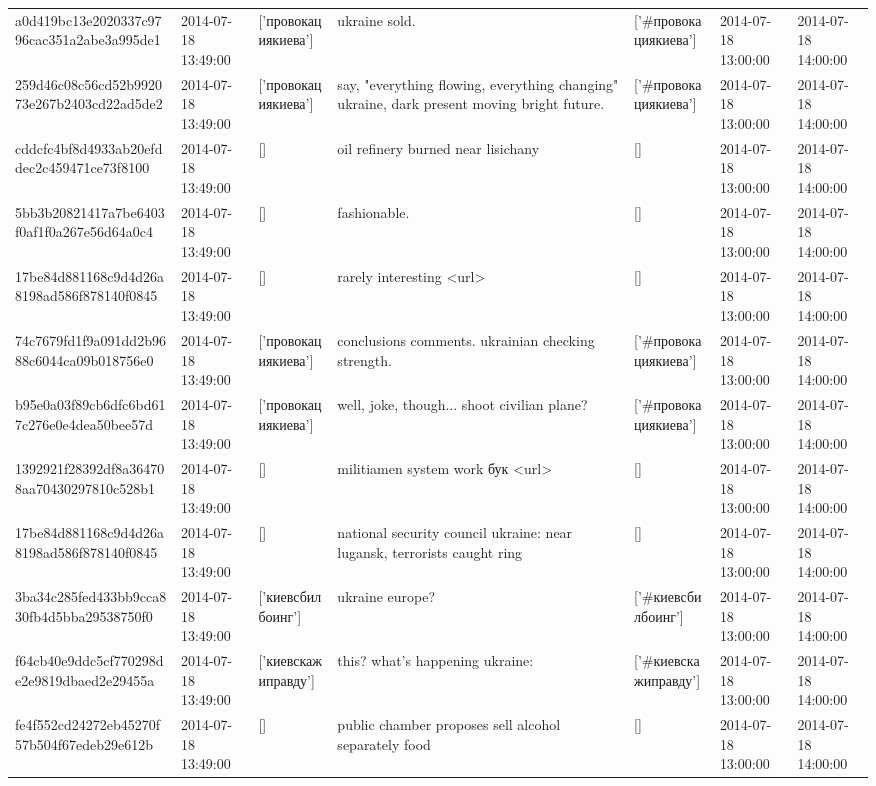\begin{tabular}{lllllll}
a0d419bc13e2020337c9796cac351a2abe3a995de1 & 2014-07-18 13:49:00 & ['провокациякиева'] & ukraine sold. & ['#провокациякиева'] & 2014-07-18 13:00:00 & 2014-07-18 14:00:00 \\
259d46c08c56cd52b992073e267b2403cd22ad5de2 & 2014-07-18 13:49:00 & ['провокациякиева'] & say, "everything flowing, everything changing" ukraine, dark present moving bright future. & ['#провокациякиева'] & 2014-07-18 13:00:00 & 2014-07-18 14:00:00 \\
cddcfc4bf8d4933ab20efddec2c459471ce73f8100 & 2014-07-18 13:49:00 & [] & oil refinery burned near lisichany & [] & 2014-07-18 13:00:00 & 2014-07-18 14:00:00 \\
5bb3b20821417a7be6403f0af1f0a267e56d64a0c4 & 2014-07-18 13:49:00 & [] & fashionable. & [] & 2014-07-18 13:00:00 & 2014-07-18 14:00:00 \\
17be84d881168c9d4d26a8198ad586f878140f0845 & 2014-07-18 13:49:00 & [] & rarely interesting <url> & [] & 2014-07-18 13:00:00 & 2014-07-18 14:00:00 \\
74c7679fd1f9a091dd2b9688c6044ca09b018756e0 & 2014-07-18 13:49:00 & ['провокациякиева'] & conclusions comments. ukrainian checking strength. & ['#провокациякиева'] & 2014-07-18 13:00:00 & 2014-07-18 14:00:00 \\
b95e0a03f89cb6dfc6bd617c276e0e4dea50bee57d & 2014-07-18 13:49:00 & ['провокациякиева'] & well, joke, though... shoot civilian plane? & ['#провокациякиева'] & 2014-07-18 13:00:00 & 2014-07-18 14:00:00 \\
1392921f28392df8a364708aa70430297810c528b1 & 2014-07-18 13:49:00 & [] & militiamen system work бук <url> & [] & 2014-07-18 13:00:00 & 2014-07-18 14:00:00 \\
17be84d881168c9d4d26a8198ad586f878140f0845 & 2014-07-18 13:49:00 & [] & national security council ukraine: near lugansk, terrorists caught ring & [] & 2014-07-18 13:00:00 & 2014-07-18 14:00:00 \\
3ba34c285fed433bb9cca830fb4d5bba29538750f0 & 2014-07-18 13:49:00 & ['киевсбилбоинг'] & ukraine europe? & ['#киевсбилбоинг'] & 2014-07-18 13:00:00 & 2014-07-18 14:00:00 \\
f64cb40e9ddc5cf770298de2e9819dbaed2e29455a & 2014-07-18 13:49:00 & ['киевскажиправду'] & this? what's happening ukraine: & ['#киевскажиправду'] & 2014-07-18 13:00:00 & 2014-07-18 14:00:00 \\
fe4f552cd24272eb45270f57b504f67edeb29e612b & 2014-07-18 13:49:00 & [] & public chamber proposes sell alcohol separately food & [] & 2014-07-18 13:00:00 & 2014-07-18 14:00:00 \\

\end{tabular}
